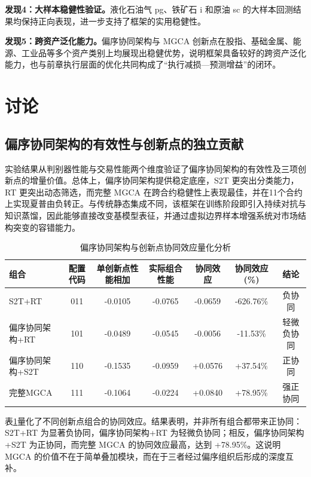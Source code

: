 \textbf{发现4：大样本稳健性验证。}液化石油气 pg、铁矿石 i 和原油 sc 的大样本回测结果均保持正向表现，进一步支持了框架的实用稳健性。

\textbf{发现5：跨资产泛化能力。}偏序协同架构与 MGCA 创新点在股指、基础金属、能源、工业品等多个资产类别上均展现出稳健优势，说明框架具备较好的跨资产泛化能力，也与前章执行层面的优化共同构成了“执行减损—预测增益”的闭环。

\section{讨论}
\subsection{偏序协同架构的有效性与创新点的独立贡献}
实验结果从判别器性能与交易性能两个维度验证了偏序协同架构的有效性及三项创新点的增量价值。总体上，偏序协同架构提供稳定底座，S2T 更突出分类能力，RT 更突出动态筛选，而完整 MGCA 在跨合约稳健性上表现最佳，并在11个合约上实现夏普由负转正。与传统静态集成不同，该框架在训练阶段即引入持续对抗与知识蒸馏，因此能够直接改变基模型表征，并通过虚拟边界样本增强系统对市场结构突变的容错能力。

\begin{table}[htbp]
\centering
\caption{偏序协同架构与创新点协同效应量化分析}
\label{tab:synergyEffect}
\footnotesize
\setlength{\tabcolsep}{4pt}
\begin{tabular}{lcccccc}
\toprule
\textbf{组合} & \textbf{配置代码} & \textbf{单创新点性能相加} & \textbf{实际组合性能} & \textbf{协同效应} & \textbf{协同效应(\%)} & \textbf{结论} \\
\midrule
S2T+RT & 011 & -0.0105 & -0.0765 & -0.0659 & -626.76\% & 负协同 \\
偏序协同架构+RT & 101 & -0.0489 & -0.0545 & -0.0056 & -11.53\% & 轻微负协同 \\
偏序协同架构+S2T & 110 & -0.1535 & -0.0959 & +0.0576 & +37.54\% & 正协同 \\
完整MGCA & 111 & -0.1064 & -0.0224 & +0.0840 & +78.95\% & 强正协同 \\
\bottomrule
\end{tabular}
\end{table}

表\ref{tab:synergyEffect}量化了不同创新点组合的协同效应。结果表明，并非所有组合都带来正协同：S2T+RT 为显著负协同，偏序协同架构+RT 为轻微负协同；相反，偏序协同架构+S2T 为正协同，而完整 MGCA 的协同效应最高，达到 +78.95\%。这说明 MGCA 的价值不在于简单叠加模块，而在于三者经过偏序组织后形成的深度互补。

